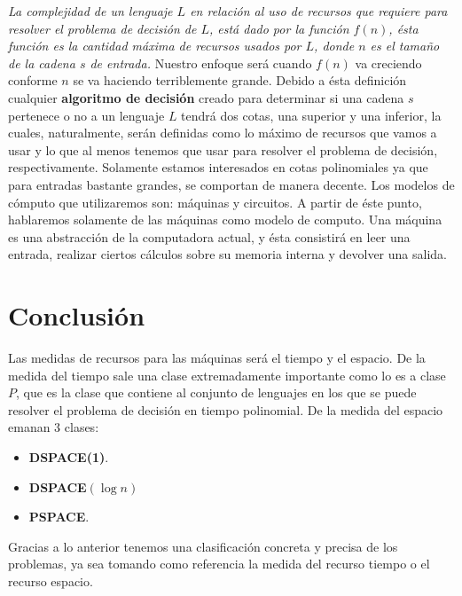 \documentclass{article}
\begin{document}
\newline 
\textit{La complejidad de un lenguaje \(L\) en relación al uso de recursos que requiere para resolver el problema de decisión de 
\(L\), está dado por la función \(f(n)\), ésta función es la cantidad máxima de recursos usados por \(L\), donde \(n\) es el 
tamaño de la cadena \(s\) de entrada.} Nuestro enfoque será cuando \(f(n)\) va creciendo conforme \(n\) se va haciendo 
terriblemente grande. Debido a ésta definición cualquier \textbf{algoritmo de decisión} creado para determinar si una 
cadena \(s\) pertenece o no a un lenguaje \(L\) tendrá dos cotas, una superior y una inferior, la cuales, naturalmente, 
serán definidas como lo máximo de recursos que vamos a usar y lo que al menos tenemos que usar para resolver el problema 
de decisión, respectivamente. 
\newline
Solamente estamos interesados en cotas polinomiales ya que para entradas bastante grandes, se comportan de manera decente.
\newline 
Los modelos de cómputo que utilizaremos son: máquinas y circuitos. A partir de éste punto, hablaremos solamente de las máquinas como modelo de computo.
Una máquina es una abstracción de la computadora actual, y ésta consistirá en leer una entrada, realizar ciertos cálculos sobre su memoria interna y devolver 
una salida. 
\section{Conclusión}
\noindent
Las medidas de recursos para las máquinas será el tiempo y el espacio. De la medida del tiempo sale una clase extremadamente 
importante como lo es a clase \(P\), que es la clase que contiene al conjunto de lenguajes en los que se 
puede resolver el problema de decisión en tiempo polinomial. De la medida del espacio emanan 3 clases:
\begin{itemize}
    \item \textbf{DSPACE(1)}.
    \item \textbf{DSPACE\(\left(\log{n}\right)\)}
    \item \textbf{PSPACE}.
\end{itemize}
Gracias a lo anterior tenemos una clasificación concreta y precisa de los problemas, ya sea tomando 
como referencia la medida del recurso tiempo o el recurso espacio.
\end{document}
